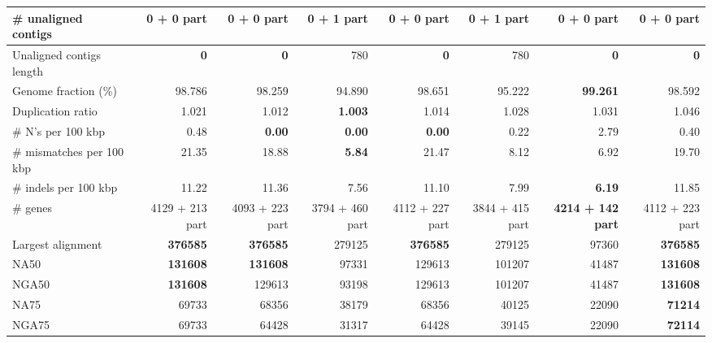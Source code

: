 \documentclass[12pt,a4paper]{article}
\begin{document}
\begin{table}[ht]
\begin{center}
\begin{tabular}{|l*{7}{|r}|}
\# unaligned contigs & {\bf 0 + 0 part} & {\bf 0 + 0 part} & 0 + 1 part & {\bf 0 + 0 part} & 0 + 1 part & {\bf 0 + 0 part} & {\bf 0 + 0 part} \\ \hline
Unaligned contigs length & {\bf 0} & {\bf 0} & 780 & {\bf 0} & 780 & {\bf 0} & {\bf 0} \\ \hline
Genome fraction (\%) & 98.786 & 98.259 & 94.890 & 98.651 & 95.222 & {\bf 99.261} & 98.592 \\ \hline
Duplication ratio & 1.021 & 1.012 & {\bf 1.003} & 1.014 & 1.028 & 1.031 & 1.046 \\ \hline
\# N's per 100 kbp & 0.48 & {\bf 0.00} & {\bf 0.00} & {\bf 0.00} & 0.22 & 2.79 & 0.40 \\ \hline
\# mismatches per 100 kbp & 21.35 & 18.88 & {\bf 5.84} & 21.47 & 8.12 & 6.92 & 19.70 \\ \hline
\# indels per 100 kbp & 11.22 & 11.36 & 7.56 & 11.10 & 7.99 & {\bf 6.19} & 11.85 \\ \hline
\# genes & 4129 + 213 part & 4093 + 223 part & 3794 + 460 part & 4112 + 227 part & 3844 + 415 part & {\bf 4214 + 142 part} & 4112 + 223 part \\ \hline
Largest alignment & {\bf 376585} & {\bf 376585} & 279125 & {\bf 376585} & 279125 & 97360 & {\bf 376585} \\ \hline
NA50 & {\bf 131608} & {\bf 131608} & 97331 & 129613 & 101207 & 41487 & {\bf 131608} \\ \hline
NGA50 & {\bf 131608} & 129613 & 93198 & 129613 & 101207 & 41487 & {\bf 131608} \\ \hline
NA75 & 69733 & 68356 & 38179 & 68356 & 40125 & 22090 & {\bf 71214} \\ \hline
NGA75 & 69733 & 64428 & 31317 & 64428 & 39145 & 22090 & {\bf 72114} \\ \hline
\end{tabular}
\end{center}
\end{table}
\end{document}
